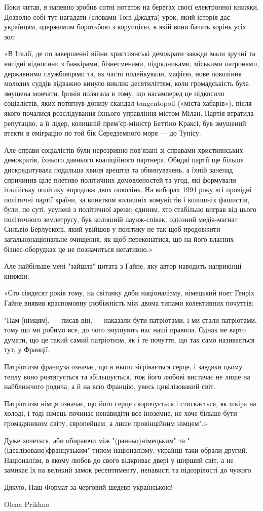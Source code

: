 Поки читав, я напевно зробив сотні нотаток на берегах своєї електронної книжки.
Дозволю собі тут нагадати (словами Тоні Джадта) урок, який історія дає
українцям, одержимим боротьбою з корупцією, в якій вони бачать корінь усіх зол:

«В Італії, де по завершенні війни християнські демократи завжди мали зручні та
вигідні відносини з банкірами, бізнесменами, підрядниками, міськими патронами,
державними службовцями та, як часто подейкували, мафією, нове покоління молодих
суддів відважно кинуло виклик десятиліттям, коли громадськість була змушена
мовчати. Іронія полягала в тому, що насамперед це підкосило соціалістів, яких
потягнув донизу скандал tangentopoli («міста хабарів»), після якого почалися
розслідування їхнього управління містом Мілан. Партія втратила репутацію, а її
лідер, колишній прем’єр-міністр Беттіно Краксі, був змушений втекти в еміграцію
по той бік Середземного моря — до Тунісу.

Але справи соціалістів були нерозривно пов’язані зі справами християнських
демократів, їхнього давнього коаліційного партнера. Обидві партії ще більше
дискредитувала подальша хвиля арештів та обвинувачень, а їхній занепад
спричинив ціле плетиво політичних домовленостей та угод, які формували
італійську політику впродовж двох поколінь. На виборах 1994 року всі провідні
політичні партії країни, за винятком колишніх комуністів і колишніх фашистів,
були, по суті, усунені з політичної арени; єдиним, хто стабільно виграв від
цього політичного землетрусу, був колишній лаунж-­співак, одіозний медіа-магнат
Сильвіо Берлусконі, який увійшов у політику не так щоб продовжити
загальнонаціональне очищення, як щоб переконатися, що на його власних
бізнес-­оборудках це не позначиться негативно.»

Але найбільше мені "зайшла" цитата з Гайне, яку автор наводить наприкінці
книжки:

«Сто сімдесят років тому, на світанку доби націоналізму, німецький поет Генріх
Гайне виявив красномовну розбіжність між двома типами колективних почуттів:

"Нам [німцям], — писав він, — наказали бути патріотами, і ми стали патріотами,
тому що ми робимо все, до чого змушують нас наші правила. Однак не варто
думати, що це такий самий патріотизм, як і те почуття, що так само називається
тут, у Франції. 

Патріотизм француза означає, що в нього зігрівається серце, і завдяки цьому
теплу воно розтягується та збільшується, тож його любові вистачає не лише на
найближчого родича, а й на всю Францію, увесь цивілізований світ. 

Патріотизм німця означає, що його серце скорочується і стискається, як шкіра на
холоді, і тоді німець починає ненавидіти все іноземне, не хоче більше бути
громадянином світу, європейцем, а лише провінційним німцем".»

Дуже хочеться, аби обираючи між "(ранньо)німецьким" та
"(ідеалізовано)французьким" типом націоналізму, українці таки обрали другий.
Націоналізм, в якому любов до свого відкриває двері у ширший світ, а не замикає
їх на великий замок ресентименту, ненависті та підозрілості до чужого.

Дякую, Наш Формат за черговий шедевр українською!

Olena Prikhno
